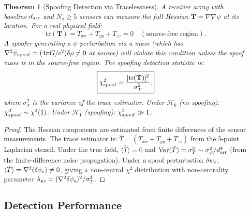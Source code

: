 \documentclass[aps,prd,twocolumn,superscriptaddress,nofootinbib]{revtex4-2}
\newtheorem{theorem}{Theorem}
\begin{document}
\begin{theorem}[Spoofing Detection via Tracelessness]
\label{thm:spoof-detect}
A receiver array with baseline $d_{\rm arr}$ and $N_a \geq 5$
sensors can measure the full Hessian $\mathbf{T} = \nabla\nabla\psi$
at its location.  For a real physical field:
\begin{equation}
  \mathrm{tr}(\mathbf{T}) = T_{xx} + T_{yy} + T_{zz} = 0
  \quad (\text{source-free region}).
  \label{eq:traceless}
\end{equation}
A spoofer generating a $\psi$-perturbation via a mass (which has
$\nabla^2\psi_{\rm spoof} = (4\pi G/c^2)\delta\rho \neq 0$ at source)
will violate this condition unless the spoof mass is in the source-free
region.  The spoofing detection statistic is:
\begin{equation}
  \boxed{
  \chi^2_{\rm spoof} = \frac{[\mathrm{tr}(\hat{\mathbf{T}})]^2}
  {\sigma_T^2},
  }
  \label{eq:spoof-stat}
\end{equation}
where $\sigma_T^2$ is the variance of the trace estimator.  Under
$\mathcal{H}_0$ (no spoofing): $\chi^2_{\rm spoof} \sim \chi^2(1)$.
Under $\mathcal{H}_1$ (spoofing): $\chi^2_{\rm spoof} \gg 1$.
\end{theorem}

\begin{proof}
The Hessian components are estimated from finite differences of the
sensor measurements.  The trace estimator is:
$\hat{T} = (T_{xx} + T_{yy} + T_{zz})$
from the 5-point Laplacian stencil.  Under the true field,
$\langle\hat{T}\rangle = 0$ and
$\mathrm{Var}(\hat{T}) = \sigma_T^2 \sim \sigma_\psi^2/d_{\rm arr}^4$
(from the finite-difference noise propagation).
Under a spoof perturbation $\delta\psi_{\rm s}$,
$\langle\hat{T}\rangle = \nabla^2(\delta\psi_{\rm s}) \neq 0$,
giving a non-central $\chi^2$ distribution with non-centrality
parameter $\lambda_{\rm nc} = (\nabla^2\delta\psi_{\rm s})^2/\sigma_T^2$.
\end{proof}

\subsection{Detection Performance}
\end{document}
